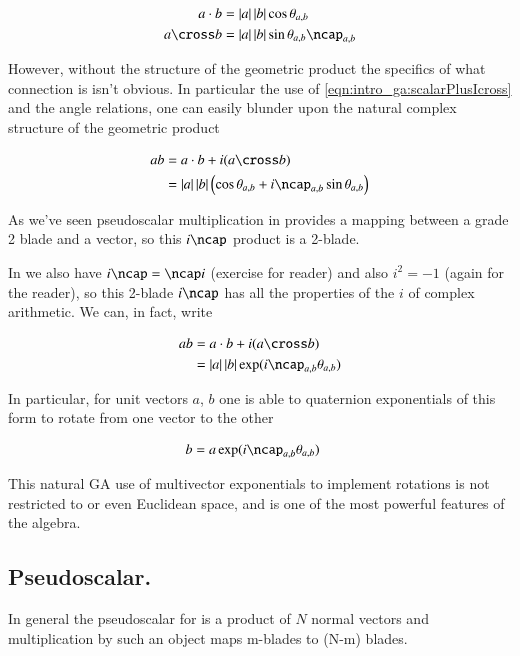 \begin{align*}
a \cdot b &= \Abs{a}\Abs{b} \cos\theta_{a,b} \\
a \cross b &= \Abs{a}\Abs{b} \sin\theta_{a,b} \ncap_{a,b}
\end{align*}

However, without the structure of the geometric product the specifics of what 
connection is isn't obvious.  In particular the use of \ref{eqn:intro_ga:scalarPlusIcross} and the angle relations, one can easily
blunder upon the natural complex structure of the geometric product

\begin{align*}
a b 
&= a \cdot b + i (a \cross b) \\
&=
\Abs{a}\Abs{b} \left( \cos\theta_{a,b} + i\ncap_{a,b} \sin\theta_{a,b} \right) \\
\end{align*}

As we've seen pseudoscalar multiplication in  provides a mapping between a grade 2 blade and a vector, so 
this $i\ncap$ product is a 2-blade.

In  we also have $i \ncap = \ncap i$ (exercise for reader) and also $i^2 = -1$ (again for the reader), so this 
2-blade $i\ncap$ has all the properties of the $i$ of complex arithmetic.  We can, in fact, write

\begin{align*}
a b 
&= a \cdot b + i (a \cross b) \\
&=
\Abs{a}\Abs{b} \exp( i\ncap_{a,b} \theta_{a,b} )
\end{align*}

In particular, for unit vectors $a$, $b$ one is able to quaternion exponentials of this form to rotate from one vector to the other

\begin{align*}
b &= a \exp( i\ncap_{a,b} \theta_{a,b} )
\end{align*}

This natural GA use
of multivector exponentials to implement rotations is not restricted to  or even Euclidean space, and is one of the most
powerful features of the algebra.

\subsection{Pseudoscalar. }

In general the
pseudoscalar for  is a product of $N$ normal vectors and multiplication by such an object maps m-blades to (N-m) blades.

